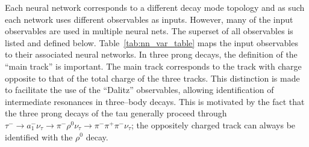 Each neural network corresponds to a different decay mode topology and as such
each network uses different observables as inputs.  However, many of the input
observables are used in multiple neural nets.  The superset of all observables
is listed and defined below. Table~\ref{tab:nn_var_table} maps the input
observables to their associated neural networks.  
In three prong
decays, the definition of the ``main track'' is important.  The main track
corresponds to the track with charge opposite to that of the total charge of the
three tracks.  This distinction is made to facilitate the use of the ``Dalitz''
observables, allowing identification of intermediate resonances in three--body
decays.  This is motivated by the fact that the three prong decays of the tau
generally proceed through $\tau^{-} \to a_1^{-} \nu_\tau \rightarrow
\pi^{-} \rho^0 \nu_\tau \to \pi^{-} \pi^{+} \pi^{-} \nu_\tau$; the
oppositely charged track can always be identified with the $\rho^0$ decay.



